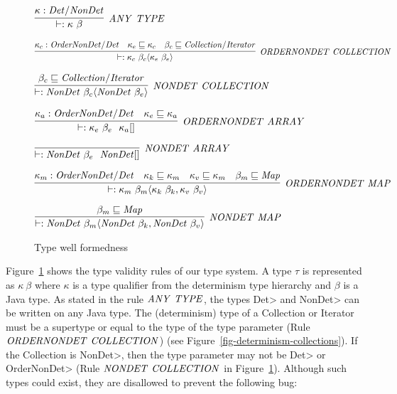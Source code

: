 %
%
%
\begin{figure}
    $\infer[\sc{\mathit{ANY\ TYPE}}]{\vdash : \kappa \  \beta}{\kappa : \mathit{Det / NonDet}}$
    
    \bigskip
    
    $\infer[\sc{\mathit{ORDERNONDET \ COLLECTION}}]{\vdash : \kappa_c \  \beta_c \langle\kappa_e \ \beta_e\rangle}{\kappa_c : \mathit{OrderNonDet/Det} & \kappa_e \sqsubseteq \kappa_c & \beta_c \sqsubseteq \mathit{Collection/Iterator}}$
    
    \bigskip
    
    $\infer[\sc{\mathit{NONDET \ COLLECTION}}]{\vdash : \mathit{NonDet} \ \beta_c\langle\mathit{NonDet} \ \beta_e\rangle}{\beta_c \sqsubseteq \mathit{Collection/Iterator}}$
    
    \bigskip
    
     $\infer[\sc{\mathit{ORDERNONDET \ ARRAY}}]{\vdash : \kappa_e \ \beta_e \ \  \kappa_a []}{\kappa_a : \mathit{OrderNonDet/Det} & \kappa_e \sqsubseteq \kappa_a }$
    
    \bigskip
    
    $\infer[\sc{\mathit{NONDET \ ARRAY}}]{\vdash : \mathit{NonDet} \ \beta_e \ \  \mathit{NonDet} []}{}$
    
    \bigskip
    
    $\infer[\sc{\mathit{ORDERNONDET \ MAP}}]{\vdash : \kappa_m \  \beta_m \langle\kappa_k \ \beta_k, \kappa_v \ \beta_v\rangle}{\kappa_m: \mathit{OrderNonDet/Det} & \kappa_k \sqsubseteq \kappa_m & \kappa_v \sqsubseteq \kappa_m & \beta_m \sqsubseteq \mathit{Map}}$
    
    \bigskip
    
    $\infer[\sc{\mathit{NONDET \ MAP}}]{\vdash : \mathit{NonDet} \ \beta_m\langle\mathit{NonDet} \ \beta_k, \mathit{NonDet} \ \beta_v\rangle}{\beta_m \sqsubseteq \mathit{Map}}$
    
    \caption{Type well formedness}
    \label{type-validity}
\end{figure}

Figure~\ref{type-validity} shows the type validity rules of our type system. A type $\tau$ is represented as $\kappa \ \beta$
where $\kappa$ is a type qualifier from the determinism type hierarchy and $\beta$ is a Java type.
As stated in the rule $\sc{\mathit{ANY\ TYPE}}$, the types \<Det> and \<NonDet> can be written on any Java type.
The (determinism) type of a Collection or Iterator must be a supertype or equal to
the type of the type parameter (Rule $\sc{\mathit{ORDERNONDET \ COLLECTION}}$) (see Figure~\ref{fig-determinism-collections}).
If the Collection is \<NonDet>, then the type parameter may not be
\<Det> or \<OrderNonDet> (Rule $\sc{\mathit{NONDET \ COLLECTION}}$ in Figure~\ref{type-validity}). Although such types could exist, they are
disallowed to prevent the following bug:

